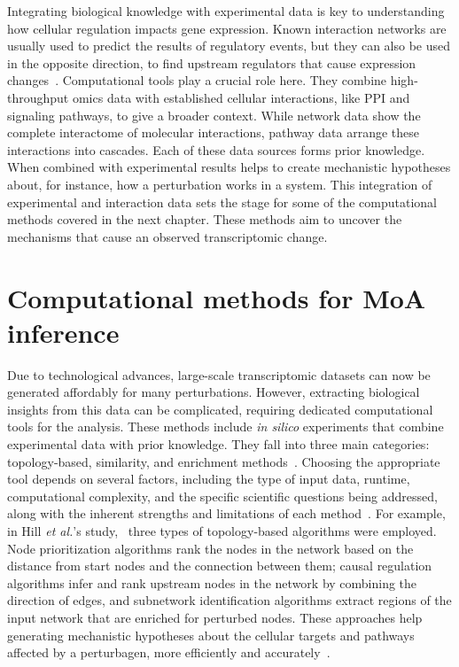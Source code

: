 Integrating biological knowledge with experimental data is key to understanding how cellular regulation impacts gene expression. Known interaction networks are usually used to predict the results of regulatory events, but they can also be used in the opposite direction, to find upstream regulators that cause expression changes~\cite{RN131}. Computational tools play a crucial role here. They combine high-throughput omics data with established cellular interactions, like \gls{PPI} and signaling pathways, to give a broader context. While network data show the complete interactome of molecular interactions, pathway data arrange these interactions into cascades. Each of these data sources forms prior knowledge. When combined with experimental results helps to create mechanistic hypotheses about, for instance, how a perturbation works in a system. This integration of experimental and interaction data sets the stage for some of the computational methods covered in the next chapter. These methods aim to uncover the mechanisms that cause an observed transcriptomic change.

\section{Computational methods for MoA inference} %
\label{sec:ComputationalmethodsforMoAinference}

Due to technological advances, large-scale transcriptomic datasets can now be generated affordably for many perturbations. 
However, extracting biological insights from this data can be complicated, requiring dedicated computational tools for the analysis. 
These methods include \textit{in silico} experiments that combine experimental data with prior knowledge. 
They fall into three main categories: topology-based, similarity, and enrichment methods~\cite{RN57, RN56}. 
Choosing the appropriate tool depends on several factors, including the type of input data, runtime, computational complexity, and the specific scientific questions being addressed, along with the inherent strengths and limitations of each method~\cite{RN38}. 
For example, in Hill \textit{et al.}'s study,~\cite{RN37} three types of topology-based algorithms were employed. 
Node prioritization algorithms rank the nodes in the network based on the distance from start nodes and the connection between them; causal regulation algorithms infer and rank upstream nodes in the network by combining the direction of edges, and subnetwork identification algorithms extract regions of the input network that are enriched for perturbed nodes. 
These approaches help generating mechanistic hypotheses about the cellular targets and pathways affected by a perturbagen, more efficiently and accurately~\cite{RN100}. 

